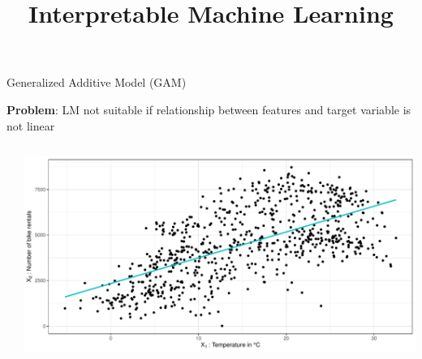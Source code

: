\documentclass[11pt,compress,t,notes=noshow, aspectratio=169, xcolor=table]{beamer}
\title{Interpretable Machine Learning}
\date{}
\begin{document}
\newcommand{\titlefigure}{figure/gam_effects.pdf}
\newcommand{\learninggoals}{
\item Generalized additive model
\item Model-based boosting with simple base learners
\item Feature effect and importance in model-based boosting}



\begin{frame}{Generalized Additive Model (GAM) }

\textbf{Problem}: LM not suitable if relationship between features and target variable is not linear %

\begin{columns}[totalwidth=\textwidth]
    \begin{column}{0.55\textwidth}
    
    \end{column}
    \begin{column}{0.45\textwidth}
        \begin{center}
            \includegraphics[width = .95\textwidth]{figure/intro_lm_bike.pdf}
        \end{center}
    \end{column}
\end{columns}


\end{frame}
\end{document}
